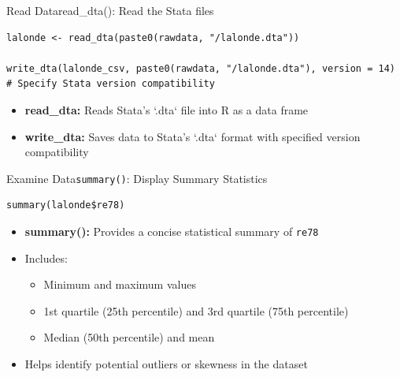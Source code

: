 \documentclass[hyperref={pdfpagelabels=false}]{beamer}
\begin{document}
\begin{frame}[fragile]{Read Data}{read\_dta(): Read the Stata files}
\begin{lstlisting}
lalonde <- read_dta(paste0(rawdata, "/lalonde.dta"))

write_dta(lalonde_csv, paste0(rawdata, "/lalonde.dta"), version = 14) # Specify Stata version compatibility
\end{lstlisting}
	
	\begin{itemize}
		\vspace{0.2cm}
			\item \textbf{read\_dta:} Reads Stata's `.dta` file into R as a data frame
					\vspace{0.2cm}
		\item \textbf{write\_dta:} Saves data to Stata's `.dta` format with specified version compatibility
		\vspace{0.2cm}
	

	
	\end{itemize}
\end{frame}



\begin{frame}[fragile]{Examine Data}{\texttt{summary()}: Display Summary Statistics}
\begin{lstlisting}
summary(lalonde$re78)
\end{lstlisting}
\begin{itemize}
	\vspace{0.2cm}
	\item \textbf{summary():} Provides a concise statistical summary of \texttt{re78}
	\vspace{0.2cm}
	\item Includes:
	\begin{itemize}
		\item Minimum and maximum values
		\vspace{0.2cm}
		\item 1st quartile (25th percentile) and 3rd quartile (75th percentile)
		\vspace{0.2cm}
		\item Median (50th percentile) and mean
	\end{itemize}
	\vspace{0.2cm}
	\item Helps identify potential outliers or skewness in the dataset
\end{itemize}
\end{frame}
\end{document}
